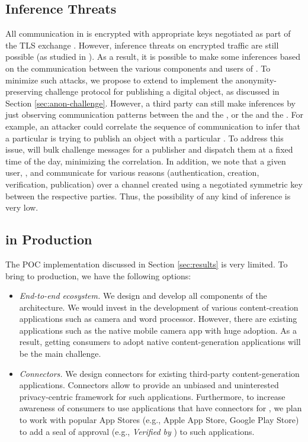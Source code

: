 \subsection{Inference Threats}
All communication in \name is encrypted with appropriate keys negotiated as part of the TLS exchange \cite{RFC5246}. However, inference threats on encrypted traffic are still possible (as studied in \cite{wbmm07, mhjt14}). As a result, it is possible to make some inferences based on the communication between the various components and users of \name. To minimize such attacks, we propose to extend \name to implement the anonymity-preserving challenge protocol for publishing a digital object, as discussed in Section \ref{sec:anon-challenge}. However, a third party can still make inferences by just observing communication patterns between the \owner and the \ta, or the \ta and the \publisher. For example, an attacker could correlate the sequence of communication to infer that a particular \owner is trying to publish an object with a particular \publisher. To address this issue, \ta will bulk challenge messages for a publisher and dispatch them at a fixed time of the day, minimizing the correlation. In addition, we note that a given user, \app, and \ta communicate for various reasons (authentication, creation, verification, publication) over a channel created using a negotiated symmetric key between the respective parties. Thus, the possibility of any kind of inference is very low. 

\subsection{\name in Production}
The POC implementation discussed in Section \ref{sec:results} is very limited. To bring \name to production, we have the following options:

\begin{itemize}
    \item {\em End-to-end ecosystem. } We design and develop all components of the architecture. We would invest in the development of various content-creation applications such as camera and word processor. However, there are existing applications such as the native mobile camera app with huge adoption. As a result, getting consumers to adopt native \name content-generation applications will be the main challenge. 
    \item {\em Connectors. } We design connectors for existing third-party content-generation applications. Connectors allow \name to provide an unbiased and uninterested privacy-centric framework for such applications. Furthermore, to increase awareness of consumers to use applications that have connectors for \name, we plan to work with popular App Stores (e.g., Apple App Store, Google Play Store) to add a seal of approval (e.g., {\em Verified by \name}) to such applications. 
\end{itemize}

